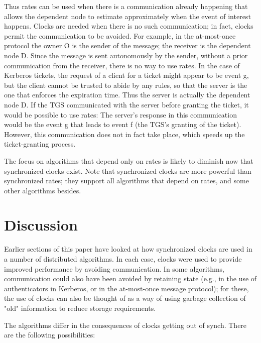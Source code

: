 \documentclass[a4paper,11pt,notitlepage,twoside,openright]{article}
\begin{document}
Thus rates can be used when there is a communication already happening
that allows the dependent node to estimate approximately when the event
of interest happens. Clocks are needed when there is no such
communication; in fact, clocks permit the communication to be avoided.
For example, in the at-most-once protocol the owner O is the sender of
the message; the receiver is the dependent node D. Since the message is
sent autonomously by the sender, without a prior communication from the
receiver, there is no way to use rates. In the case of Kerberos tickets,
the request of a client for a ticket might appear to be event g, but the
client cannot be trusted to abide by any rules, so that the server is
the one that enforces the expiration time. Thus the server is actually
the dependent node D. If the TGS communicated with the server before
granting the ticket, it would be possible to use rates: The server's
response in this communication would be the event g that leads to event
f (the TGS's granting of the ticket). However, this communication does
not in fact take place, which speeds up the ticket-granting process.

The focus on algorithms that depend only on rates is likely to diminish
now that synchronized clocks exist. Note that synchronized clocks are
more powerful than synchronized rates; they support all algorithms that
depend on rates, and some other algorithms besides.

\hypertarget{discussion}{%
\section{Discussion}\label{discussion}}


Earlier sections of this paper have looked at how synchronized clocks
are used in a number of distributed algorithms. In each case, clocks
were used to provide improved performance by avoiding communication. In
some algorithms, communication could also have been avoided by retaining
state (e.g., in the use of authenticators in Kerberos, or in the
at-most-once message protocol); for these, the use of clocks can also be
thought of as a way of using garbage collection of "old" information to
reduce storage requirements.

The algorithms differ in the consequences of clocks getting out of
synch. There are the following possibilities:
\end{document}
